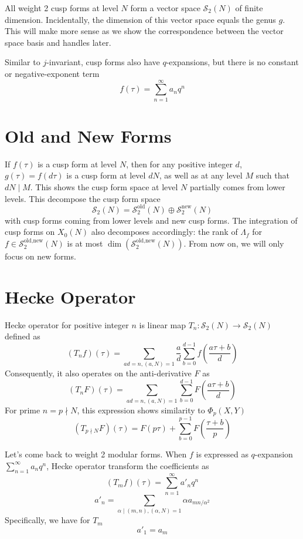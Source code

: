 \documentclass[]{article}
\begin{document}
All weight 2 cusp forms at level $N$ form a vector space $\mathcal{S}_2(N)$ of finite dimension. Incidentally, the dimension of this vector space equals the genus $g$. This will make more sense as we show the correspondence between the vector space basis and handles later.

Similar to $j$-invariant, cusp forms also have $q$-expansions, but there is no constant or negative-exponent term
\[
f(\tau) = \sum_{n = 1}^{\infty} a_n q^n
\]

\section{Old and New Forms}

If $f(\tau)$ is a cusp form at level $N$, then for any positive integer $d$, $g(\tau) = f(d\tau)$ is a cusp form at level $dN$, as well as at any level $M$ such that $dN \mid M$. This shows the cusp form space at level $N$ partially comes from lower levels. This decompose the cusp form space
\[
\mathcal{S}_2(N) =   \mathcal{S}_2^{\mbox{old}}(N) \oplus \mathcal{S}_2^{\mbox{new}}(N)
\]
with cusp forms coming from lower levels and new cusp forms. The integration of cusp forms on $X_0(N)$ also decomposes accordingly: the rank of $\Lambda_f$ for $f\in\mathcal{S}_2^{\mbox{old,new}}(N)$ is at most $\dim\left(\mathcal{S}_2^{\mbox{old,new}}(N)\right)$. From now on, we will only focus on new forms.

\section{Hecke Operator}
Hecke operator for positive integer $n$ is linear map $T_n: \mathcal{S}_2(N)\to\mathcal{S}_2(N)$ defined as
\[
(T_n f)(\tau) = \sum_{ad=n, (a,N) = 1} \frac{a}{d} \sum_{b = 0}^{d - 1}  f\left(\frac{a\tau+b}{d}\right)
\]
Consequently, it also operates on the anti-derivative $F$ as
\[
(T_n F)(\tau) = \sum_{ad=n, (a,N) = 1}  \sum_{b = 0}^{d - 1}  F\left(\frac{a\tau+b}{d}\right)
\]
For prime $n = p \nmid N$, this expression shows similarity to $\Phi_p(X, Y)$
\[
(T_{p\nmid N} F)(\tau) = F\left(p\tau\right) + \sum_{b = 0}^{p - 1}  F\left(\frac{\tau+b}{p}\right)
\]

Let's come back to weight 2 modular forms. When $f$ is expressed as $q$-expansion $\sum_{n = 1}^{\infty} a_n q^n$, Hecke operator transform the coefficients as
\[
(T_m f)(\tau) = \sum_{n=1}^{\infty} a'_n q^n
\]
\[
a'_n = \sum_{\alpha\mid(m,n),(\alpha,N) = 1} \alpha a_{mn/\alpha^2}
\]
Specifically, we have for $T_m$
\[
a'_1 = a_m
\]
\end{document}
